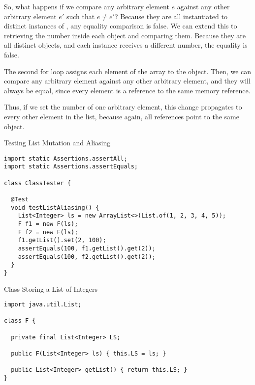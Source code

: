 So, what happens if we compare any arbitrary element $e$ against any other arbitrary element $e'$ such that $e \neq e'$? Because they are all instantiated to distinct instances of , any equality comparison is false. We can extend this to retrieving the number inside each  object and comparing them. Because they are all distinct objects, and each  instance receives a different number, the equality is false.

The second for loop assigns each element of the array to the  object. Then, we can compare any arbitrary element against any other arbitrary element, and they will always be equal, since every element is a reference to the same memory reference. 

Thus, if we set the number of one arbitrary element, this change propagates to every other element in the list, because again, all references point to the same object.


\begin{cl}[]{Testing List Mutation and Aliasing}
\begin{lstlisting}[language=MyJava]
import static Assertions.assertAll;
import static Assertions.assertEquals;

class ClassTester {

  @Test
  void testListAliasing() {
    List<Integer> ls = new ArrayList<>(List.of(1, 2, 3, 4, 5));
    F f1 = new F(ls);
    F f2 = new F(ls);
    f1.getList().set(2, 100);
    assertEquals(100, f1.getList().get(2));
    assertEquals(100, f2.getList().get(2));
  }
}
\end{lstlisting}
\end{cl}

\begin{cl}[]{Class Storing a List of Integers}
\begin{lstlisting}[language=MyJava]
import java.util.List;

class F {
  
  private final List<Integer> LS;
  
  public F(List<Integer> ls) { this.LS = ls; }
  
  public List<Integer> getList() { return this.LS; }
}
\end{lstlisting}
\end{cl}

